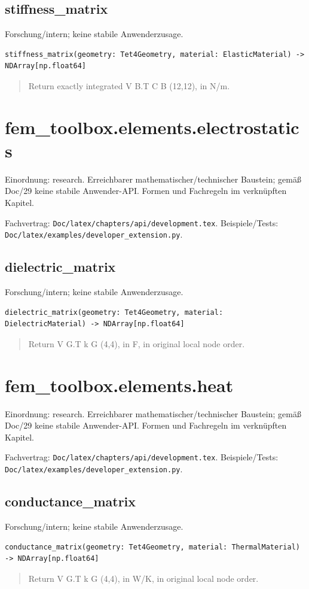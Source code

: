 \subsection{stiffness\_matrix}
Forschung/intern; keine stabile Anwenderzusage.
\begin{lstlisting}
stiffness_matrix(geometry: Tet4Geometry, material: ElasticMaterial) -> NDArray[np.float64]
\end{lstlisting}
\begin{quote}
Return exactly integrated V B.T C B (12,12), in N/m.
\end{quote}
\section{fem\_toolbox.elements.electrostatics}
Einordnung: research. Erreichbarer mathematischer/technischer Baustein; gemäß Doc/29 keine stabile Anwender-API. Formen und Fachregeln im verknüpften Kapitel.
\par Fachvertrag: \nolinkurl{Doc/latex/chapters/api/development.tex}. Beispiele/Tests:
\nolinkurl{Doc/latex/examples/developer_extension.py}.
\subsection{dielectric\_matrix}
Forschung/intern; keine stabile Anwenderzusage.
\begin{lstlisting}
dielectric_matrix(geometry: Tet4Geometry, material: DielectricMaterial) -> NDArray[np.float64]
\end{lstlisting}
\begin{quote}
Return V G.T k G (4,4), in F, in original local node order.
\end{quote}
\section{fem\_toolbox.elements.heat}
Einordnung: research. Erreichbarer mathematischer/technischer Baustein; gemäß Doc/29 keine stabile Anwender-API. Formen und Fachregeln im verknüpften Kapitel.
\par Fachvertrag: \nolinkurl{Doc/latex/chapters/api/development.tex}. Beispiele/Tests:
\nolinkurl{Doc/latex/examples/developer_extension.py}.
\subsection{conductance\_matrix}
Forschung/intern; keine stabile Anwenderzusage.
\begin{lstlisting}
conductance_matrix(geometry: Tet4Geometry, material: ThermalMaterial) -> NDArray[np.float64]
\end{lstlisting}
\begin{quote}
Return V G.T k G (4,4), in W/K, in original local node order.
\end{quote}
